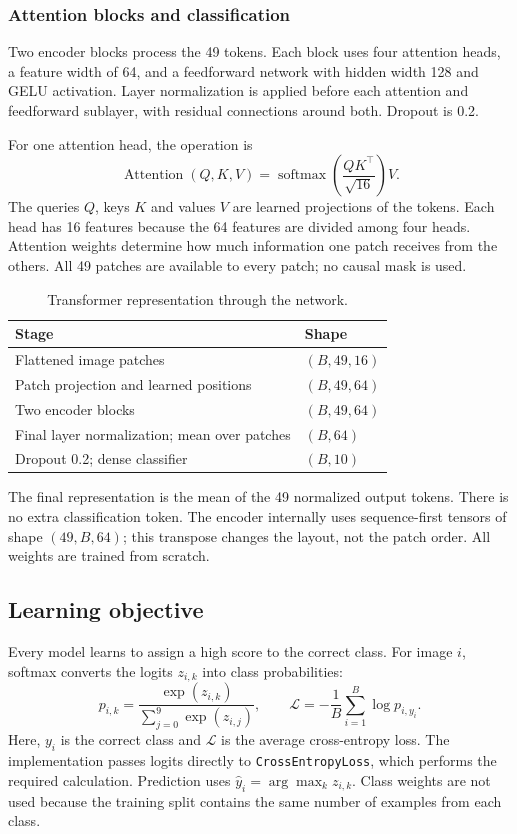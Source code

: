 \subsubsection{Attention blocks and classification}
Two encoder blocks process the 49 tokens. Each block uses four attention heads,
a feature width of 64, and a feedforward network with hidden width 128 and
GELU activation. Layer normalization is applied before each attention and
feedforward sublayer, with residual connections around both. Dropout is 0.2.

For one attention head, the operation is
\[
\operatorname{Attention}(Q,K,V)
=\operatorname{softmax}\left(\frac{QK^\top}{\sqrt{16}}\right)V.
\]
The queries $Q$, keys $K$ and values $V$ are learned projections of the tokens.
Each head has 16 features because the 64 features are divided among four heads.
Attention weights determine how much information one patch receives from the
others. All 49 patches are available to every patch; no causal mask is used.

\begin{table}[h]
\centering
\caption{Transformer representation through the network.}
\label{tab:fresh_transformer}
\begin{tabularx}{\linewidth}{X l}
\toprule
Stage & Shape\\
\midrule
Flattened image patches & $(B,49,16)$\\
Patch projection and learned positions & $(B,49,64)$\\
Two encoder blocks & $(B,49,64)$\\
Final layer normalization; mean over patches & $(B,64)$\\
Dropout 0.2; dense classifier & $(B,10)$\\
\bottomrule
\end{tabularx}
\end{table}

The final representation is the mean of the 49 normalized output tokens.
There is no extra classification token. The encoder internally uses
sequence-first tensors of shape $(49,B,64)$; this transpose changes the layout,
not the patch order. All weights are trained from scratch.

\subsection{Learning objective}
Every model learns to assign a high score to the correct class. For image $i$,
softmax converts the logits $z_{i,k}$ into class probabilities:
\[
p_{i,k}=\frac{\exp(z_{i,k})}{\sum_{j=0}^{9}\exp(z_{i,j})},
\qquad
\mathcal{L}=-\frac{1}{B}\sum_{i=1}^{B}\log p_{i,y_i}.
\]
Here, $y_i$ is the correct class and $\mathcal{L}$ is the average cross-entropy
loss. The implementation passes logits directly to
\texttt{CrossEntropyLoss}, which performs the required calculation.
Prediction uses $\hat y_i=\arg\max_k z_{i,k}$. Class weights are not used because
the training split contains the same number of examples from each class.

